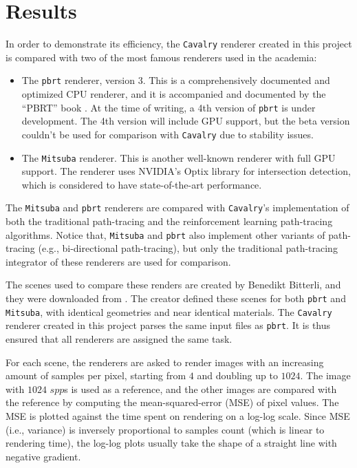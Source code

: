 \chapter{Results}

In order to demonstrate its efficiency, the \texttt{Cavalry} renderer created in this project is compared with two of the most famous renderers used in the academia:

\begin{itemize}
    \item The \texttt{pbrt} renderer, version 3. This is a comprehensively documented and optimized CPU renderer, and it is accompanied and documented by the ``PBRT'' book \cite{pharr2016physically}. At the time of writing, a 4th version of \texttt{pbrt} is under development. The 4th version will include GPU support, but the beta version couldn't be used for comparison with \texttt{Cavalry} due to stability issues.
    
    \item The \texttt{Mitsuba} renderer. This is another well-known renderer with full GPU support. The renderer uses NVIDIA's Optix library for intersection detection, which is considered to have state-of-the-art performance.  
\end{itemize}

The \texttt{Mitsuba} and \texttt{pbrt} renderers are compared with \texttt{Cavalry}'s implementation of both the traditional path-tracing and the reinforcement learning path-tracing algorithms. Notice that, \texttt{Mitsuba} and \texttt{pbrt} also implement other variants of path-tracing (e.g., bi-directional path-tracing), but only the traditional path-tracing integrator of these renderers are used for comparison.

The scenes used to compare these renders are created by Benedikt Bitterli, and they were downloaded from \cite{resources16}. The creator defined these scenes for both \texttt{pbrt} and \texttt{Mitsuba}, with identical geometries and near identical materials. The \texttt{Cavalry} renderer created in this project parses the same input files as \texttt{pbrt}. It is thus ensured that all renderers are assigned the same task.

For each scene, the renderers are asked to render images with an increasing amount of samples per pixel, starting from $4$ and doubling up to $1024$. The image with $1024$ $spp$s is used as a reference, and the other images are compared with the reference by computing the mean-squared-error (MSE) of pixel values. The MSE is plotted against the time spent on rendering on a log-log scale. Since MSE (i.e., variance) is inversely proportional to samples count (which is linear to rendering time), the log-log plots usually take the shape of a straight line with negative gradient.

